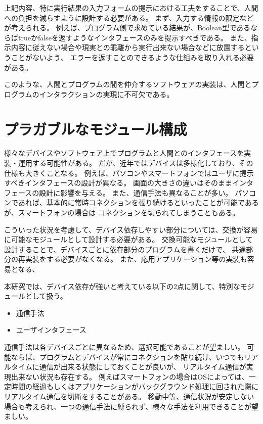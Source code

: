 上記内容、特に実行結果の入力フォームの提示における工夫をすることで、人間への負担を減らすように設計する必要がある。
まず、入力する情報の限定などが考えられる。
例えば、プログラム側で求めている結果が、Boolean型であるならばtrueかfalseを返すようなインタフェースのみを提示すべきである。
また、指示内容に従えない場合や現実との乖離から実行出来ない場合などに放置するということがないよう、
エラーを返すことのできるような仕組みを取り入れる必要がある。

このような、人間とプログラムの間を仲介するソフトウェアの実装は、人間とプログラムのインタラクションの実現に不可欠である。

\section{プラガブルなモジュール構成}\label{sec:plaggable-module-design}

様々なデバイスやソフトウェア上でプログラムと人間とのインタフェースを実装・運用する可能性がある。
だが、近年ではデバイスは多様化しており、その仕様も大きくことなる。
例えば、パソコンやスマートフォンではユーザに提示すべきインタフェースの設計が異なる。
画面の大きさの違いはそのままインタフェースの設計に影響を与える。
また、通信手法も異なることが多い。
パソコンであれば、基本的に常時コネクションを張り続けるといったことが可能であるが、スマートフォンの場合は
コネクションを切られてしまうこともある。

こういった状況を考慮して、デバイス依存しやすい部分については、交換が容易に可能なモジュールとして設計する必要がある。
交換可能なモジュールとして設計することで、デバイスごとに依存部分のプログラムを書くだけで、
共通部分の再実装をする必要がなくなる。
また、応用アプリケーション等の実装も容易となる、

本研究では、デバイス依存が強いと考えている以下の2点に関して、特別なモジュールとして扱う。

\begin{itemize}
\itemsep1pt\parskip0pt
\item
  通信手法
\item
  ユーザインタフェース
\end{itemize}

通信手法は各デバイスごとに異なるため、選択可能であることが望ましい。
可能ならば、プログラムとデバイスが常にコネクションを貼り続け、いつでもリアルタイムに通信が出来る状態にしておくことが良いが、
リアルタイム通信が実現出来ない状況も存在する。
例えばスマートフォンの場合はOSによっては、一定時間の経過もしくはアプリケーションがバックグラウンド処理に回された際に
リアルタイム通信を切断をすることがある。
移動中等、通信状況が安定しない場合も考えられ、一つの通信手法に縛られず、様々な手法を利用できることが望ましい。

